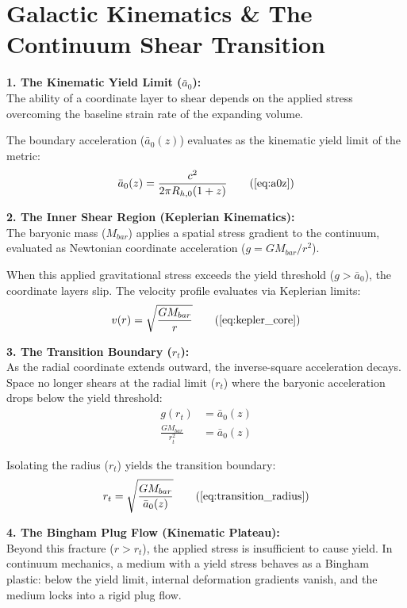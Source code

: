 \section{Galactic Kinematics \& The Continuum Shear Transition}
\label{sec:deriv_galactic_dynamics}

\textbf{1. The Kinematic Yield Limit ($\bar{a}_0$):} \\
The ability of a coordinate layer to shear depends on the applied stress overcoming the baseline strain rate of the expanding volume. 

The boundary acceleration ($\bar{a}_0(z)$) evaluates as the kinematic yield limit of the metric: 
\begin{equation}
    \bar{a}_0(z) = \frac{c^2}{2\pi R_{h,0}(1+z)} \tag{\ref{eq:a0z}}
\end{equation}

\textbf{2. The Inner Shear Region (Keplerian Kinematics):} \\
The baryonic mass ($M_{bar}$) applies a spatial stress gradient to the continuum, evaluated as Newtonian coordinate acceleration ($g = GM_{bar}/r^2$). 

When this applied gravitational stress exceeds the yield threshold ($g > \bar{a}_0$), the coordinate layers slip. The velocity profile evaluates via Keplerian limits:
\begin{equation}
    v(r) = \sqrt{\frac{G M_{bar}}{r}} \tag{\ref{eq:kepler_core}} 
\end{equation}

\textbf{3. The Transition Boundary ($r_t$):} \\
As the radial coordinate extends outward, the inverse-square acceleration decays. Space no longer shears at the radial limit ($r_t$) where the baryonic acceleration drops below the yield threshold: 
\begin{align}
    g(r_t) &= \bar{a}_0(z) \label{eq:fracture_boundary} \\
    \frac{G M_{bar}}{r_t^2} &= \bar{a}_0(z) \label{eq:fracture_substitution}
\end{align}

Isolating the radius ($r_t$) yields the transition boundary: 
\begin{equation}
    r_t = \sqrt{\frac{G M_{bar}}{\bar{a}_0(z)}} \tag{\ref{eq:transition_radius}}
\end{equation}

\textbf{4. The Bingham Plug Flow (Kinematic Plateau):} \\
Beyond this fracture ($r > r_t$), the applied stress is insufficient to cause yield. In continuum mechanics, a medium with a yield stress behaves as a Bingham plastic: below the yield limit, internal deformation gradients vanish, and the medium locks into a rigid plug flow. 

